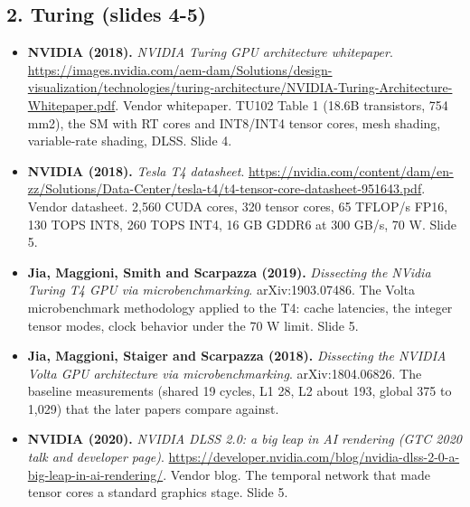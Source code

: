 \subsection*{2. Turing (slides 4-5)}
\begin{itemize}[leftmargin=1.2em,itemsep=3pt]\sloppy
\item \textbf{NVIDIA (2018).} \textit{NVIDIA Turing GPU architecture whitepaper}. \url{https://images.nvidia.com/aem-dam/Solutions/design-visualization/technologies/turing-architecture/NVIDIA-Turing-Architecture-Whitepaper.pdf}. Vendor whitepaper. TU102 Table 1 (18.6B transistors, 754 mm2), the SM with RT cores and INT8/INT4 tensor cores, mesh shading, variable-rate shading, DLSS. Slide 4.
\item \textbf{NVIDIA (2018).} \textit{Tesla T4 datasheet}. \url{https://nvidia.com/content/dam/en-zz/Solutions/Data-Center/tesla-t4/t4-tensor-core-datasheet-951643.pdf}. Vendor datasheet. 2,560 CUDA cores, 320 tensor cores, 65 TFLOP/s FP16, 130 TOPS INT8, 260 TOPS INT4, 16 GB GDDR6 at 300 GB/s, 70 W. Slide 5.
\item \textbf{Jia, Maggioni, Smith and Scarpazza (2019).} \textit{Dissecting the NVidia Turing T4 GPU via microbenchmarking}. arXiv:1903.07486. The Volta microbenchmark methodology applied to the T4: cache latencies, the integer tensor modes, clock behavior under the 70 W limit. Slide 5.
\item \textbf{Jia, Maggioni, Staiger and Scarpazza (2018).} \textit{Dissecting the NVIDIA Volta GPU architecture via microbenchmarking}. arXiv:1804.06826. The baseline measurements (shared 19 cycles, L1 28, L2 about 193, global 375 to 1,029) that the later papers compare against.
\item \textbf{NVIDIA (2020).} \textit{NVIDIA DLSS 2.0: a big leap in AI rendering (GTC 2020 talk and developer page)}. \url{https://developer.nvidia.com/blog/nvidia-dlss-2-0-a-big-leap-in-ai-rendering/}. Vendor blog. The temporal network that made tensor cores a standard graphics stage. Slide 5.
\end{itemize}
